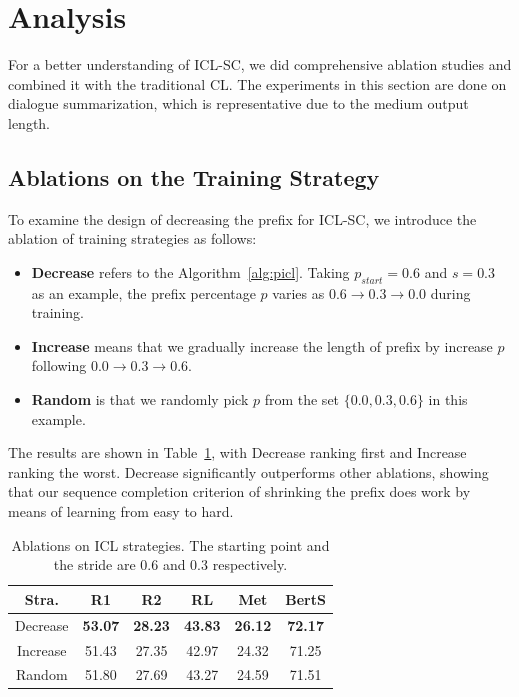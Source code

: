 \section{Analysis}


For a better understanding of ICL-SC, 
we did comprehensive ablation studies and combined it with the traditional CL. The experiments in this section are done on dialogue summarization, which is representative due to the medium output length.




\subsection{Ablations on the Training Strategy}

To examine the design of decreasing the prefix for ICL-SC, we introduce the ablation of training strategies as follows:
\begin{itemize}
	\item \textbf{Decrease} refers to the Algorithm~\ref{alg:picl}. Taking $p_{start}=0.6$ and $s=0.3$ as an example, the prefix percentage $p$ varies as $0.6\rightarrow 0.3\rightarrow 0.0$ during training.
	\item \textbf{Increase} means that we gradually increase the length of prefix by increase $p$ following $0.0\rightarrow0.3\rightarrow0.6$.
	\item \textbf{Random} is that we randomly pick $p$ from the set $\{0.0, 0.3, 0.6\}$ in this example.
\end{itemize}

The results are shown in Table~\ref{tab:ablstrategy}, with Decrease ranking first and Increase ranking the worst.
Decrease significantly outperforms other ablations, showing that our sequence completion criterion of shrinking the prefix does work by means of learning from easy to hard.

\begin{table}[th]
	\scriptsize
	\centering
	\begin{tabular}{cccccc}
		\hline
		{Stra.} & {R1} & {R2} & {RL} & {Met} & {BertS} \\
		\hline
		Decrease &\textbf{53.07} & \textbf{28.23} & \textbf{43.83} & \textbf{26.12} & \textbf{72.17}\\
		Increase & 51.43 & 27.35 & 42.97 & 24.32 & 71.25 \\
		Random & 51.80 & 27.69 & 43.27 & 24.59 & 71.51 \\
		\hline
	\end{tabular}
	\caption{Ablations on ICL strategies. The starting point and the stride are 0.6 and 0.3 respectively.}
	\label{tab:ablstrategy}
\end{table}


